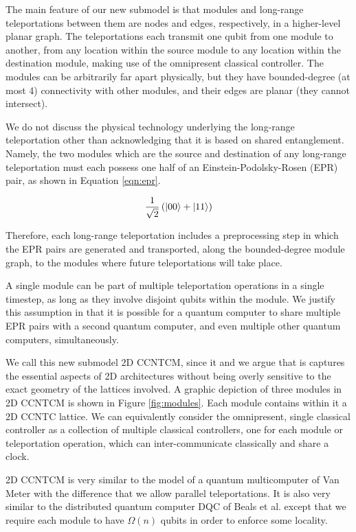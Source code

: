 The main feature of our new submodel is that modules
and long-range teleportations between them are nodes and edges, respectively,
in a higher-level planar graph. The teleportations each transmit one qubit
from one module to another, from any location within the source module
to any location within the destination module, making use of the
omnipresent classical controller. The modules can be arbitrarily far
apart physically, but they have bounded-degree (at most 4) connectivity with other
modules, and their edges are planar (they cannot intersect).

We do not discuss the physical technology underlying the long-range
teleportation other than acknowledging that it is based on shared
entanglement. Namely, the two modules which are the source and destination
of any long-range teleportation must each possess one half of an
Einstein-Podolsky-Rosen (EPR) pair, as shown in Equation \ref{eqn:epr}.

\begin{equation}
\frac{1}{\sqrt{2}} \left( \left\vert{00}\right\rangle + \left\vert{11}\right\rangle \right)
\end{equation}

Therefore, each long-range teleportation includes a preprocessing step in
which the EPR pairs are generated and transported, along the bounded-degree
module graph, to the modules where future teleportations will take place.

A single module can be part of multiple teleportation operations in a single timestep, as long as they involve disjoint qubits within the module.
We justify this assumption in that it is
possible for a quantum computer to share multiple EPR pairs with a
second quantum computer, and even multiple other quantum computers,
simultaneously.

We call this new submodel \textsf{2D CCNTCM}, since it 
and we argue that is captures the essential aspects of 2D architectures
without being overly sensitive to the exact geometry of the lattices involved.
A graphic depiction of three modules in \textsf{2D CCNTCM} is shown in
Figure \ref{fig:modules}. Each module contains within it a
\textsf{2D CCNTC} lattice. We can equivalently consider the omnipresent,
single
classical controller as a collection of multiple classical controllers, one
for each module or teleportation operation, which can inter-communicate
classically and share a clock.

\textsf{2D CCNTCM} is very similar to the model of a quantum multicomputer
of Van Meter
\cite{VanMeter2006} with the difference that we allow parallel teleportations.
It is also very similar to the distributed quantum computer \textsf{DQC} of
Beals et al. \cite{Beals2012} except that we require each module to have
$\Omega(n)$ qubits in order to enforce some locality.

